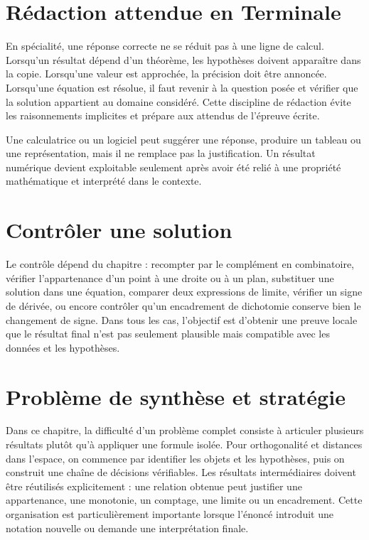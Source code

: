 \section{Rédaction attendue en Terminale}
En spécialité, une réponse correcte ne se réduit pas à une ligne de calcul. Lorsqu'un résultat dépend d'un théorème, les hypothèses doivent apparaître dans la copie. Lorsqu'une valeur est approchée, la précision doit être annoncée. Lorsqu'une équation est résolue, il faut revenir à la question posée et vérifier que la solution appartient au domaine considéré. Cette discipline de rédaction évite les raisonnements implicites et prépare aux attendus de l'épreuve écrite.

\begin{attention}
Une calculatrice ou un logiciel peut suggérer une réponse, produire un tableau ou une représentation, mais il ne remplace pas la justification. Un résultat numérique devient exploitable seulement après avoir été relié à une propriété mathématique et interprété dans le contexte.
\end{attention}

\section{Contrôler une solution}
Le contrôle dépend du chapitre : recompter par le complément en combinatoire, vérifier l'appartenance d'un point à une droite ou à un plan, substituer une solution dans une équation, comparer deux expressions de limite, vérifier un signe de dérivée, ou encore contrôler qu'un encadrement de dichotomie conserve bien le changement de signe. Dans tous les cas, l'objectif est d'obtenir une preuve locale que le résultat final n'est pas seulement plausible mais compatible avec les données et les hypothèses.

\section{Problème de synthèse et stratégie}

Dans ce chapitre, la difficulté d'un problème complet consiste à articuler plusieurs résultats plutôt qu'à appliquer une formule isolée. Pour orthogonalité et distances dans l’espace, on commence par identifier les objets et les hypothèses, puis on construit une chaîne de décisions vérifiables. Les résultats intermédiaires doivent être réutilisés explicitement : une relation obtenue peut justifier une appartenance, une monotonie, un comptage, une limite ou un encadrement. Cette organisation est particulièrement importante lorsque l'énoncé introduit une notation nouvelle ou demande une interprétation finale.


